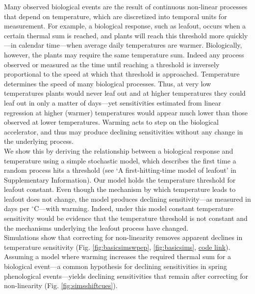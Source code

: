 \documentclass[11pt,letter]{article}
\begin{document}
Many observed biological events are the result of continuous non-linear processes that depend on temperature, which are discretized into temporal units for measurement. For example, a biological response, such as leafout, occurs when a certain thermal sum is reached, and plants will reach this threshold more quickly---in calendar time---when average daily temperatures are warmer. Biologically, however, the plants may require the same temperature sum. Indeed any process observed or measured as the time until reaching a threshold is inversely proportional to the speed at which that threshold is approached. Temperature determines the speed of many biological processes. Thus, at very low temperatures plants would never leaf out and at higher temperatures they could leaf out in only a matter of days---yet sensitivities estimated from linear regression at higher (warmer) temperatures would appear much lower than those observed at lower temperatures. Warming acts to step on the biological accelerator, and thus may produce declining sensitivities without any change in the underlying process.  \\ %

We show this by deriving the relationship between a biological response and temperature using a simple stochastic model, which describes the first time a random process hits a threshold (see `A first-hitting-time model of leafout' in Supplementary Information). Our model holds the temperature threshold for leafout constant. Even though the mechanism by which temperature leads to leafout does not change, the model produces declining sensitivity---as measured in days per $^{\circ}$C---with warming. Indeed, under this model constant temperature sensitivity would be evidence that the temperature threshold is not constant and the mechanisms underlying the leafout process have changed. \\ %

Simulations show that correcting for non-linearity removes apparent declines in temperature sensitivity (Fig. \ref{fig:basicsimswpep}, \ref{fig:basicsims}, \href{https://github.com/temporalecologylab/labgit/tree/master/projects/decsenspost}{code link}). Assuming a model where warming increases the required thermal sum for a biological event---a common hypothesis for declining sensitivities in spring phenological events---yields declining sensitivities that remain after correcting for non-linearity (Fig. \ref{fig:simsshiftcues}). \\
\end{document}
